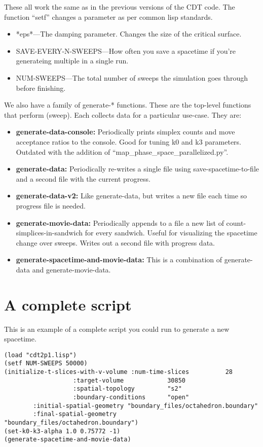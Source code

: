 \documentclass{article}
\begin{document}
These all work the same as in the previous versions of the CDT
code. The function ``setf'' changes a parameter as per common lisp
standards. 
\begin{itemize}
\item *eps*---The damping parameter. Changes the size of the critical surface.
\item SAVE-EVERY-N-SWEEPS---How often you save a spacetime if you're
  generateing multiple in a single run.
\item NUM-SWEEPS---The total number of sweeps the simulation goes
  through before finishing.
\end{itemize}

We also have a family of generate-* functions. These are the top-level
functions that perform (sweep). Each collects data for a particular
use-case. They are:
\begin{itemize}
\item \textbf{generate-data-console:} Periodically prints simplex
  counts and move acceptance ratios to the console. Good for tuning k0
  and k3 parameters. Outdated with the addition of
  ``map\_phase\_space\_parallelized.py''.
\item \textbf{generate-data:} Periodically re-writes a single file
  using save-spacetime-to-file and a second file with the current
  progress.
\item \textbf{generate-data-v2:} Like generate-data, but writes a new
  file each time so progress file is needed.
\item \textbf{generate-movie-data:} Periodically appends to a file a
  new list of count-simplices-in-sandwich for every sandwich. Useful
  for visualizing the spacetime change over sweeps. Writes out a
  second file with progress data.
\item \textbf{generate-spacetime-and-movie-data:} This is a
  combination of generate-data and generate-movie-data.
\end{itemize}

\section{A complete script}
This is an example of a complete script you could run to generate a
new spacetime.
\begin{lstlisting}
(load "cdt2p1.lisp")
(setf NUM-SWEEPS 50000)
(initialize-t-slices-with-v-volume :num-time-slices          28
				   :target-volume            30850
				   :spatial-topology         "s2"
				   :boundary-conditions      "open"
        :initial-spatial-geometry "boundary_files/octahedron.boundary"
        :final-spatial-geometry   "boundary_files/octahedron.boundary")
(set-k0-k3-alpha 1.0 0.75772 -1)
(generate-spacetime-and-movie-data)
\end{lstlisting}
\end{document}
